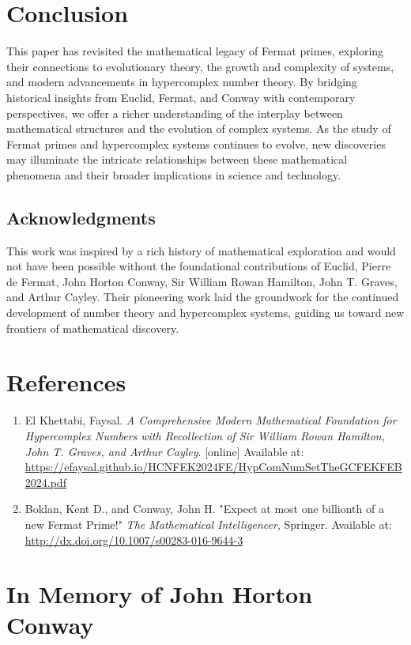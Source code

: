 \documentclass[12pt]{article}
\begin{document}
\section{Conclusion}

This paper has revisited the mathematical legacy of Fermat primes, exploring their connections to evolutionary theory, the growth and complexity of systems, and modern advancements in hypercomplex number theory. By bridging historical insights from Euclid, Fermat, and Conway with contemporary perspectives, we offer a richer understanding of the interplay between mathematical structures and the evolution of complex systems. As the study of Fermat primes and hypercomplex systems continues to evolve, new discoveries may illuminate the intricate relationships between these mathematical phenomena and their broader implications in science and technology.

\subsection*{Acknowledgments}
This work was inspired by a rich history of mathematical exploration and would not have been possible without the foundational contributions of Euclid, Pierre de Fermat, John Horton Conway, Sir William Rowan Hamilton, John T. Graves, and Arthur Cayley. Their pioneering work laid the groundwork for the continued development of number theory and hypercomplex systems, guiding us toward new frontiers of mathematical discovery.

\section*{References}

\begin{enumerate}
    \item El Khettabi, Faysal. \textit{A Comprehensive Modern Mathematical Foundation for Hypercomplex Numbers with Recollection of Sir William Rowan Hamilton, John T. Graves, and Arthur Cayley}. [online] Available at: \url{https://efaysal.github.io/HCNFEK2024FE/HypComNumSetTheGCFEKFEB2024.pdf}
    \item Boklan, Kent D., and Conway, John H. "Expect at most one billionth of a new Fermat Prime!" \textit{The Mathematical Intelligencer}, Springer. Available at: \url{http://dx.doi.org/10.1007/s00283-016-9644-3}
\end{enumerate}

\section*{In Memory of John Horton Conway}
\end{document}
